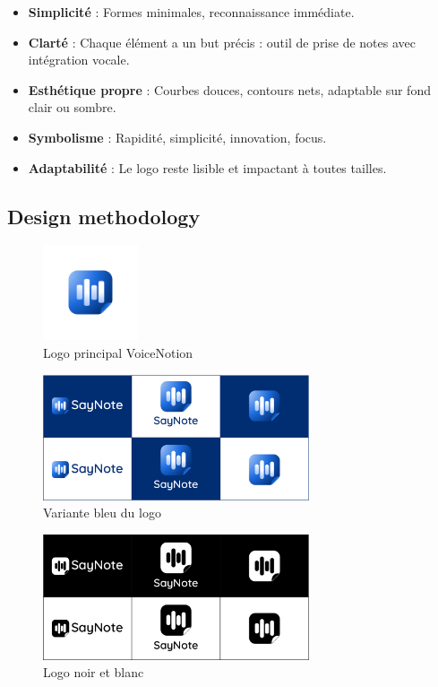 \begin{itemize}
    \item \textbf{Simplicité} : Formes minimales, reconnaissance immédiate.
    \item \textbf{Clarté} : Chaque élément a un but précis : outil de prise de notes avec intégration vocale.
    \item \textbf{Esthétique propre} : Courbes douces, contours nets, adaptable sur fond clair ou sombre.
    \item \textbf{Symbolisme} : Rapidité, simplicité, innovation, focus.
    \item \textbf{Adaptabilité} : Le logo reste lisible et impactant à toutes tailles.
\end{itemize}

\subsection{Design methodology}
\begin{figure}[H]
    \centering
    \includegraphics[width=0.25\textwidth]{docs/visual-indentity/pictures/logo.png}
    \caption{Logo principal VoiceNotion}
\end{figure}
\begin{figure}[H]
    \centering
    \includegraphics[width=0.7\textwidth]{docs/visual-indentity/pictures/logo-varaition-blue.jpg}
    \caption{Variante bleu du logo}
\end{figure}
\begin{figure}[H]
    \centering
    \includegraphics[width=0.7\textwidth]{docs/visual-indentity/pictures/logo-variation-black-and-white.jpg}
    \caption{Logo noir et blanc}
\end{figure}

